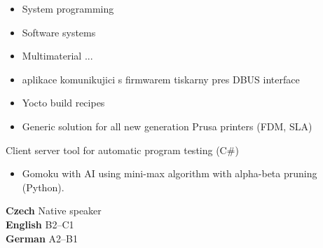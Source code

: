 

\begin{itemize}
\item System programming
\end{itemize}


\begin{itemize}
\item Software systems
\end{itemize}

\vspace{8px}



\begin{itemize}
\item Multimaterial ...
\end{itemize}

\vspace{4px}


\begin{itemize}
\item aplikace komunikujici s firmwarem tiskarny pres DBUS interface
\item Yocto build recipes
\item Generic solution for all new generation Prusa printers (FDM, SLA)
\end{itemize}

\vspace{4px}


Client server tool for automatic program testing (C\#) 
\vspace{4px}

\vspace{4px}

\begin{itemize}
\item Gomoku with AI using mini-max algorithm with alpha-beta pruning (Python).
\end{itemize}

\vspace{8px}

\textbf{ Czech} \hfill Native speaker \\
\textbf{ English} \hfill B2--C1 \\
\textbf{ German} \hfill A2--B1

